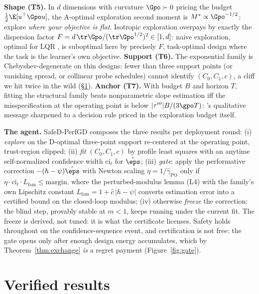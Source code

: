 \documentclass{article}
\begin{document}
\textbf{Shape (T5).} In $d$ dimensions with curvature $\Gpo \succ 0$ pricing the budget $\tfrac12\E[u^\top\Gpo u]$, the A-optimal exploration second moment is $M^* \propto \Gpo^{-1/2}$: explore \emph{where your objective is flat}. Isotropic exploration overpays by exactly the dispersion factor $F = d\,\tr\Gpo/(\tr\Gpo^{1/2})^2 \in [1, d]$: naive exploration, optimal for LQR \citep{simchowitz2020naive}, is suboptimal here by precisely $F$, task-optimal design \citep{wagenmaker2021task} where the task is the learner's own objective. \textbf{Support (T6).} The exponential family is Chebyshev-degenerate on thin designs: fewer than three support points (or vanishing spread, or collinear probe schedules) cannot identify $(C_0, C_1, c)$, a cliff we hit twice in the wild (\S\ref{sec:experiments}). \textbf{Anchor (T7).} With budget $B$ and horizon $T$, fitting the structural family beats nonparametric slope estimation iff the misspecification at the operating point is below $|\tau'''|B/(3\gpo T)$: \citet{lin2024plugin}'s qualitative message sharpened to a decision rule priced in the exploration budget itself.

\textbf{The agent.} SafeD-PerfGD composes the three results per deployment round: (i) \emph{explore} on the D-optimal three-point support re-centered at the operating point, trust-region clipped; (ii) \emph{fit} $(C_0, C_1, c)$ by profile least squares with an anytime self-normalized confidence width $\mathrm{ci}_t$ for $\hat\eps$; (iii) \emph{gate}: apply the performative correction $-(h-\psi)\hat\eps$ with Newton scaling $\eta = 1/\hat\gamma_{\mathrm{PO}}$ only if $\eta \cdot \mathrm{ci}_t \cdot L_{\mathrm{fam}} \le \text{margin}$, where the perturbed-modulus lemma (L4) with the family's own Lipschitz constant $L_{\mathrm{fam}} = 1 + \hat c\,|h - \psi|$ converts estimation error into a certified bound on the closed-loop modulus; (iv) otherwise \emph{freeze} the correction: the blind step, provably stable at $m<1$, keeps running under the current fit. The freeze is derived, not tuned: it is what the certificate licenses. Safety holds throughout on the confidence-sequence event, and certification is not free: the gate opens only after enough design energy accumulates, which by Theorem~\ref{thm:exchange} \emph{is} a regret payment (Figure~\ref{fig:gate}).

\section{Verified results}
\label{sec:experiments}
\end{document}
